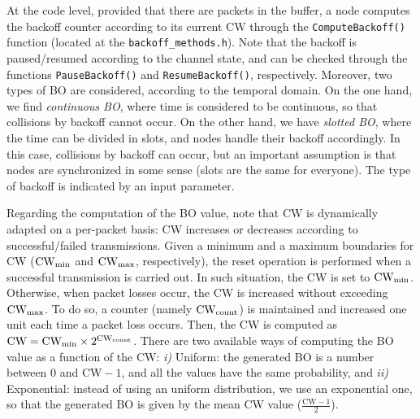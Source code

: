 \documentclass[a4paper]{article}
\begin{document}
	At the code level, provided that there are packets in the buffer, a node computes the backoff counter according to its current CW through the \texttt{ComputeBackoff()} function (located at the \texttt{backoff\_methods.h}). Note that the backoff is paused/resumed according to the channel state, and can be checked through the functions \texttt{PauseBackoff()} and \texttt{ResumeBackoff()}, respectively. Moreover, two types of BO are considered, according to the temporal domain. On the one hand, we find \textit{continuous BO}, where time is considered to be continuous, so that collisions by backoff cannot occur. On the other hand, we have \textit{slotted BO}, where the time can be divided in slots, and nodes handle their backoff accordingly. In this case, collisions by backoff can occur, but an important assumption is that nodes are synchronized in some sense (slots are the same for everyone). The type of backoff is indicated by an input parameter.
	
	Regarding the computation of the BO value, note that CW is dynamically adapted on a per-packet basis: CW increases or decreases according to successful/failed transmissions. Given a minimum and a maximum boundaries for CW ($\rm CW_{\rm min}$ and $\rm CW_{\rm max}$, respectively), the reset operation is performed when a successful transmission is carried out. In such situation, the CW is set to $\rm CW_{\rm min}$. Otherwise, when packet losses occur, the CW is increased without exceeding $\rm CW_{\rm max}$. To do so, a counter (namely $\rm CW_{\rm count}$) is maintained and increased one unit each time a packet loss occurs. Then, the CW is computed as $\rm CW = \rm CW_{\rm min} \times 2^{\rm CW_{\rm count}}$. There are two available ways of computing the BO value as a function of the CW: \emph{i)} Uniform: the generated BO is a number between 0 and $\text{CW}-1$, and all the values have the same probability, and \emph{ii)} Exponential: instead of using an uniform distribution, we use an exponential one, so that the generated BO is given by the mean CW value ($\frac{\text{CW}-1}{2}$).

\end{document}
